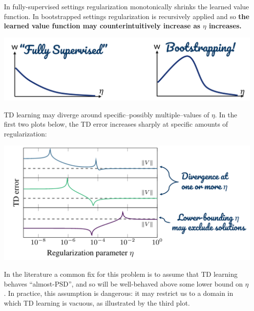 In fully-supervised settings regularization monotonically shrinks the learned value function. In bootstrapped settings regularization is recursively applied and so \textbf{the learned value function may counterintuitively increase as $\eta$ increases.}
\begin{center}
    \includegraphics[scale=0.4]{parts/nonmonotonic/illus.png}
\end{center}
TD learning may diverge around specific--possibly multiple--values of $\eta$. In the first two plots below, the TD error increases sharply at specific amounts of regularization:
\begin{center}
    \includegraphics[scale=0.4]{parts/nonmonotonic/threeex.png}
\end{center}
In the literature a common fix for this problem is to assume that TD learning behaves ``almost-PSD'', and so will be well-behaved above some lower bound on $\eta$. In practice, this assumption is dangerous: it may restrict us to a domain in which TD learning is vacuous, as illustrated by the third plot.
